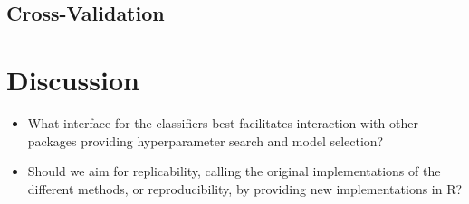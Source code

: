 \documentclass[final]{beamer}
\begin{document}
\begin{frame}[t]
\begin{multicols}{3}
\subsection{Cross-Validation}

\begin{table}

\medskip
\caption{Example of a cross-validation experiment. Indicated in $\mathbf{bold}$ is when a semi-supervised classifier has significantly lower error than the other, using a Wilcoxon signed rank test at $0.01$ significance level. A similar test is done to determine whether a semi-supervised classifier is significantly worse than the supervised classifier, indicated by \underline{underlined} values.} \label{table:cvresults}
\end{table}


\section{Discussion}
\begin{itemize}
\item What interface for the classifiers best facilitates interaction with other packages providing hyperparameter search and model selection?
\item Should we aim for replicability, calling the original implementations of the different methods, or reproducibility, by providing new implementations in R?
\end{itemize}

\end{multicols}

\end{frame}
\end{document}
